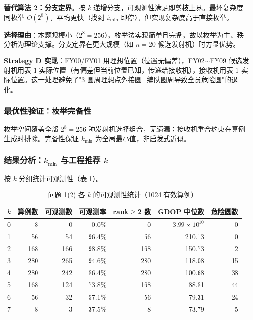 \documentclass[12pt,a4paper]{ctexart}
\begin{document}
\textbf{替代算法 2：分支定界}。按 $k$ 递增分支，可观测性满足即剪枝上界。最坏复杂度同枚举 $O(2^8)$，平均更快（找到 $k_{\min}$ 即停），但实现复杂度高于直接枚举。

\textbf{选择理由}：本题规模小（$2^8=256$），枚举法实现简单且完备，故以枚举为主、秩分析为理论支撑。分支定界在更大规模（如 $n=20$ 候选发射机）时方显优势。

\textbf{Strategy D 实现}：FY00/FY01 用理想位置（位置无偏差），FY02$\sim$FY09 候选发射机用表 1 实际位置（有偏差但当前位置已知，传递给接收机），接收机用表 1 实际位置。这一处理避免了"3 圆周理想点外接圆=编队圆周导致全员危险圆"的退化。

\subsubsection{最优性验证：枚举完备性}

枚举空间覆盖全部 $2^8=256$ 种发射机选择组合，无遗漏；接收机重合约束在算例生成时排除。完备性保证 $k_{\min}$ 为全局最小值，非启发式近似。

\subsubsection{结果分析：$k_{\min}$ 与工程推荐 $k$}

按 $k$ 分组统计可观测性（表 \ref{tab:q12-summary}）。

\begin{table}[H]
\centering
\caption{问题 1(2) 各 $k$ 的可观测性统计（1024 有效算例）}
\label{tab:q12-summary}
\begin{tabular}{lrrrrrr}
\toprule
$k$ & 算例数 & 可观测数 & 可观测率 & rank$\geq$2 数 & GDOP 中位数 & 危险圆数 \\
\midrule
0 & 8    & 0   & 0.0\%   & 0   & $3.99\times 10^{10}$ & 0  \\
1 & 56   & 54  & 96.4\%  & 56  & 210.13              & 0  \\
2 & 168  & 166 & 98.8\%  & 168 & 150.73              & 2  \\
3 & 280  & 265 & 94.6\%  & 280 & 118.08              & 15 \\
4 & 280  & 242 & 86.4\%  & 280 & 100.68              & 38 \\
5 & 168  & 124 & 73.8\%  & 168 & 88.81               & 44 \\
6 & 56   & 32  & 57.1\%  & 56  & 79.31               & 24 \\
7 & 8    & 3   & 37.5\%  & 8   & 73.79               & 5  \\
\bottomrule
\end{tabular}
\end{table}
\end{document}
